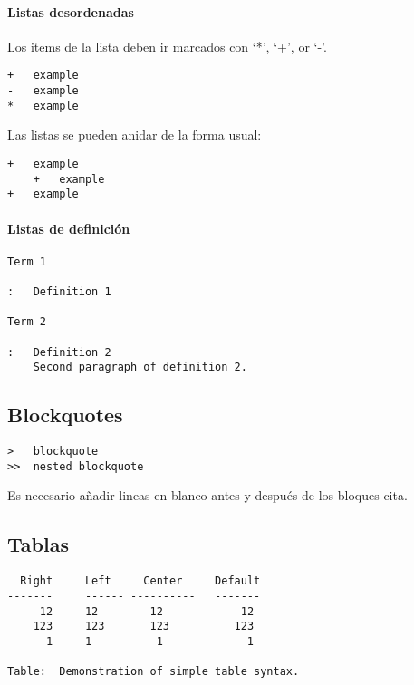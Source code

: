 \documentclass[12pt,spanish,]{article}
\let\oldparagraph\paragraph
\renewcommand{\paragraph}[1]{\oldparagraph{#1}\mbox{}}
\begin{document}
\paragraph{Listas desordenadas}\label{listas-desordenadas}

Los items de la lista deben ir marcados con `*', `+', or `-'.

\begin{verbatim}
+   example
-   example
*   example
\end{verbatim}

Las listas se pueden anidar de la forma usual:

\begin{verbatim}
+   example
    +   example
+   example
\end{verbatim}

\paragraph{Listas de definición}\label{listas-de-definiciuxf3n}

\begin{verbatim}
Term 1

:   Definition 1

Term 2

:   Definition 2
    Second paragraph of definition 2.
\end{verbatim}

\subsection{Blockquotes}\label{blockquotes}

\begin{verbatim}
>   blockquote
>>  nested blockquote
\end{verbatim}

Es necesario añadir lineas en blanco antes y después de los
bloques-cita.

\subsection{Tablas}\label{tablas}

\begin{verbatim}
  Right     Left     Center     Default
-------     ------ ----------   -------
     12     12        12            12
    123     123       123          123
      1     1          1             1

Table:  Demonstration of simple table syntax.
\end{verbatim}
\end{document}
